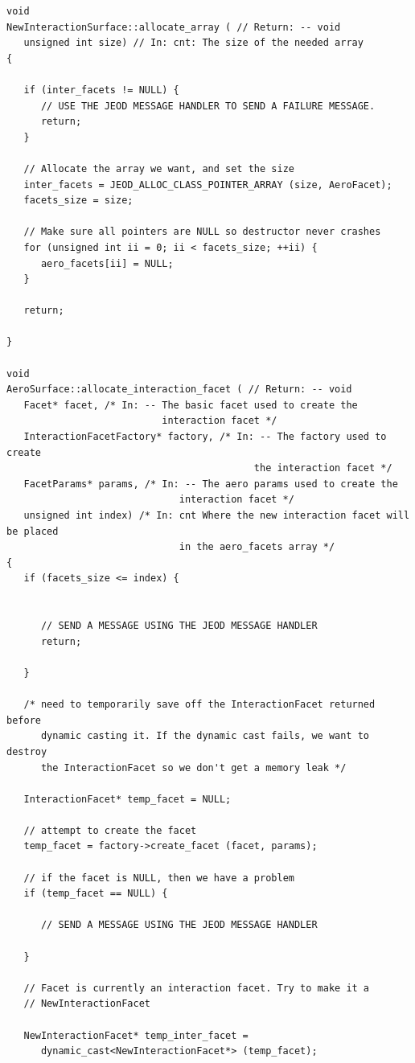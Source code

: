 \begin{verbatim}
void
NewInteractionSurface::allocate_array ( // Return: -- void
   unsigned int size) // In: cnt: The size of the needed array
{

   if (inter_facets != NULL) {
      // USE THE JEOD MESSAGE HANDLER TO SEND A FAILURE MESSAGE.
      return;
   }

   // Allocate the array we want, and set the size
   inter_facets = JEOD_ALLOC_CLASS_POINTER_ARRAY (size, AeroFacet);
   facets_size = size;

   // Make sure all pointers are NULL so destructor never crashes
   for (unsigned int ii = 0; ii < facets_size; ++ii) {
      aero_facets[ii] = NULL;
   }

   return;

}

void
AeroSurface::allocate_interaction_facet ( // Return: -- void
   Facet* facet, /* In: -- The basic facet used to create the
                           interaction facet */
   InteractionFacetFactory* factory, /* In: -- The factory used to create
                                           the interaction facet */
   FacetParams* params, /* In: -- The aero params used to create the
                              interaction facet */
   unsigned int index) /* In: cnt Where the new interaction facet will be placed
                              in the aero_facets array */
{
   if (facets_size <= index) {


      // SEND A MESSAGE USING THE JEOD MESSAGE HANDLER
      return;

   }

   /* need to temporarily save off the InteractionFacet returned before
      dynamic casting it. If the dynamic cast fails, we want to destroy
      the InteractionFacet so we don't get a memory leak */

   InteractionFacet* temp_facet = NULL;

   // attempt to create the facet
   temp_facet = factory->create_facet (facet, params);

   // if the facet is NULL, then we have a problem
   if (temp_facet == NULL) {

      // SEND A MESSAGE USING THE JEOD MESSAGE HANDLER

   }

   // Facet is currently an interaction facet. Try to make it a
   // NewInteractionFacet

   NewInteractionFacet* temp_inter_facet = 
      dynamic_cast<NewInteractionFacet*> (temp_facet);



\end{verbatim}
